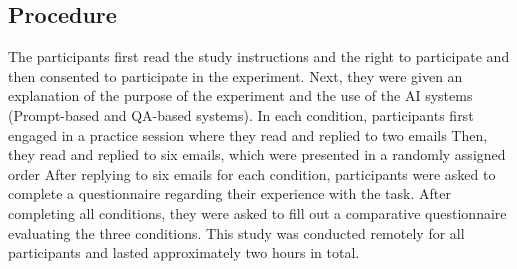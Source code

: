 \subsection{Procedure}
The participants first read the study instructions and the right to participate and then consented to participate in the experiment. 
Next, they were given an explanation of the purpose of the experiment and the use of the AI systems (Prompt-based and QA-based systems). 
In each condition, participants first engaged in a practice session where they read and replied to two emails 
Then, they read and replied to six emails, which were presented in a randomly assigned order 
After replying to six emails for each condition, participants were asked to complete a questionnaire regarding their experience with the task. 
After completing all conditions, they were asked to fill out a comparative questionnaire evaluating the three conditions. 
This study was conducted remotely for all participants and lasted approximately two  hours in total.

